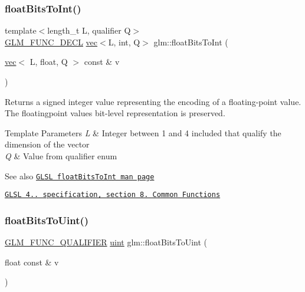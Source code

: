 \subsubsection{\texorpdfstring{float\+Bits\+To\+Int()}{floatBitsToInt()}\hspace{0.1cm}{\footnotesize\ttfamily [2/2]}}
{\footnotesize\ttfamily template$<$length\+\_\+t L, qualifier Q$>$ \\
\hyperlink{setup_8hpp_ab2d052de21a70539923e9bcbf6e83a51}{G\+L\+M\+\_\+\+F\+U\+N\+C\+\_\+\+D\+E\+CL} \hyperlink{structglm_1_1vec}{vec}$<$L, int, Q$>$ glm\+::float\+Bits\+To\+Int (\begin{DoxyParamCaption}\item[{\hyperlink{structglm_1_1vec}{vec}$<$ L, float, Q $>$ const \&}]{v }\end{DoxyParamCaption})}

Returns a signed integer value representing the encoding of a floating-\/point value. The floatingpoint value\textquotesingle{}s bit-\/level representation is preserved.


\begin{DoxyTemplParams}{Template Parameters}
{\em L} & Integer between 1 and 4 included that qualify the dimension of the vector \\
\hline
{\em Q} & Value from qualifier enum\\
\hline
\end{DoxyTemplParams}
\begin{DoxySeeAlso}{See also}
\href{http://www.opengl.org/sdk/docs/manglsl/xhtml/floatBitsToInt.xml}{\tt G\+L\+SL float\+Bits\+To\+Int man page} 

\href{http://www.opengl.org/registry/doc/GLSLangSpec.4.20.8.pdf}{\tt G\+L\+SL 4.. specification, section 8. Common Functions} 
\end{DoxySeeAlso}
\mbox{\label{group__core__func__common_ga748b4d2819b48d28ca09dc8733488873}} 
\subsubsection{\texorpdfstring{float\+Bits\+To\+Uint()}{floatBitsToUint()}\hspace{0.1cm}{\footnotesize\ttfamily [1/2]}}
{\footnotesize\ttfamily \hyperlink{setup_8hpp_a33fdea6f91c5f834105f7415e2a64407}{G\+L\+M\+\_\+\+F\+U\+N\+C\+\_\+\+Q\+U\+A\+L\+I\+F\+I\+ER} \hyperlink{group__core__precision_ga4fd29415871152bfb5abd588334147c8}{uint} glm\+::float\+Bits\+To\+Uint (\begin{DoxyParamCaption}\item[{float const \&}]{v }\end{DoxyParamCaption})}

